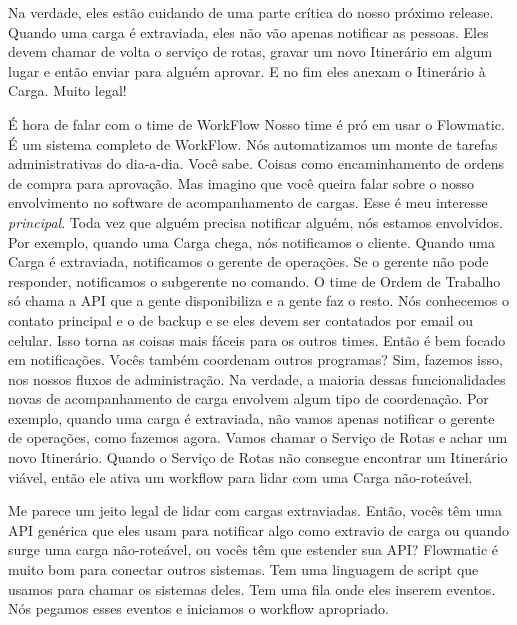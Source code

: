 \documentclass[12pt,play]{article}
\begin{document}
Na verdade, eles estão cuidando de uma parte crítica do nosso próximo release. Quando uma carga é extraviada, eles não vão apenas notificar as pessoas. Eles devem chamar de volta o serviço de rotas, gravar um novo Itinerário em algum lugar e então enviar para alguém aprovar. E no fim eles anexam o Itinerário à Carga. Muito legal!
\narr {}

\scene 
\narr É hora de falar com o time de WorkFlow
\paty Nosso time é pró em usar o Flowmatic. É um sistema completo de WorkFlow. Nós automatizamos um monte de tarefas administrativas do dia-a-dia. Você sabe. Coisas como encaminhamento de ordens de compra para aprovação. Mas imagino que você queira falar sobre o nosso envolvimento no software de acompanhamento de cargas.
\serg Esse é meu interesse \emph{principal}.
\paty Toda vez que alguém precisa notificar alguém, nós estamos envolvidos. Por exemplo, quando uma Carga chega, nós notificamos o cliente. Quando uma Carga é extraviada, notificamos o gerente de operações. Se o gerente não pode responder, notificamos o subgerente no comando. O time de Ordem de Trabalho só chama a API que a gente disponibiliza e a gente faz o resto. Nós conhecemos o contato principal e o de backup e se eles devem ser contatados por email ou celular. Isso torna as coisas mais fáceis para os outros times.
\serg Então é bem focado em notificações. Vocês também coordenam outros programas?
\paty Sim, fazemos isso, nos nossos fluxos de administração. Na verdade, a maioria dessas funcionalidades novas de acompanhamento de carga envolvem algum tipo de coordenação. Por exemplo, quando uma carga é extraviada, não vamos apenas notificar o gerente de operações, como fazemos agora. Vamos chamar o Serviço de Rotas e achar um novo Itinerário. Quando o Serviço de Rotas não consegue encontrar um Itinerário viável, então ele ativa um workflow para lidar com uma Carga não-roteável.

\narr {}


\serg Me parece um jeito legal de lidar com cargas extraviadas. Então, vocês têm uma API genérica que eles usam para notificar algo como extravio de carga ou quando surge uma carga não-roteável, ou vocês têm que estender sua API? 
\paty Flowmatic é muito bom para conectar outros sistemas. Tem uma linguagem de script que usamos para chamar os sistemas deles. Tem uma fila onde eles inserem eventos. Nós pegamos esses eventos e iniciamos o workflow apropriado.
\end{document}
